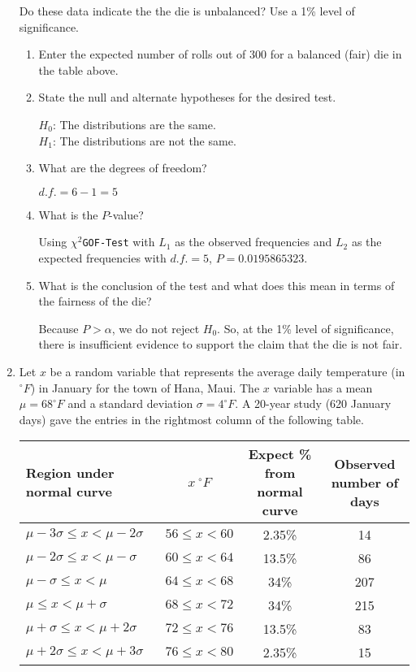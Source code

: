 \documentclass{article}
\begin{document}
\begin{enumerate}
Do these data indicate the the die is unbalanced?  Use a 1\% level of significance.

	\begin{enumerate}
	\item Enter the expected number of rolls out of 300 for a balanced (fair) die in the table above.
	\item State the null and alternate hypotheses for the desired test. 
	
	{\answer 
	$H_0$: The distributions are the same. \\ $H_1$: The distributions are not the same.
	} 
	
	\item What are the degrees of freedom? 
	
	{\answer 
	$d.f. = 6-1 = 5$
	} 
	
	\item What is the $P$-value?  
	
	{\answer 
	Using \texttt{$\chi^2$GOF-Test} with $L_1$ as the observed frequencies and $L_2$ as the expected frequencies with $d.f. = 5$, $P=0.0195865323$.
	} 

	\item What is the conclusion of the test and what does this mean in terms of the fairness of the die? 
	
	{\answer 
	Because $P > \alpha$, we do not reject $H_0$.  So, at the 1\% level of significance, there is insufficient evidence to support the claim that the die is not fair.
	} 
	
	\end{enumerate}
	
\vfill
\pagebreak

\item Let $x$ be a random variable that represents the average daily temperature (in $^\circ F$) in January for the town of Hana, Maui.  The $x$ variable has a mean $\mu = 68^\circ F$ and a standard deviation $\sigma = 4^\circ F$.  A 20-year study (620 January days) gave the entries in the rightmost column of the following table. 

\begin{tabular}{l||c||c||c}
Region under normal curve & $x\ ^\circ F$ & Expect \% from normal curve & Observed number of days \\
\hline \hline
$\mu -3\sigma \leq x < \mu - 2\sigma$ & $56 \leq x < 60$ & 2.35\% & 14 \\
\hline
$\mu -2\sigma \leq x < \mu - \sigma$ & $60 \leq x < 64$ & 13.5\% & 86 \\
\hline
$\mu -\sigma \leq x < \mu $ & $64 \leq x < 68$ & 34\% & 207 \\
\hline
$\mu \leq x < \mu + \sigma$ & $68 \leq x < 72$ & 34\% & 215 \\
\hline
$\mu +\sigma \leq x < \mu + 2\sigma$ & $72 \leq x < 76$ & 13.5\% & 83 \\
\hline
$\mu +2\sigma \leq x < \mu + 3\sigma$ & $76 \leq x < 80$ & 2.35\% & 15 \\
\hline
\end{tabular}


\end{enumerate}
\end{document}
